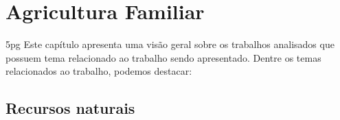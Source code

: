 \chapter{Agricultura Familiar} 5pg
Este cap\'{i}tulo apresenta uma vis\~{a}o geral sobre os trabalhos analisados que possuem tema relacionado ao trabalho sendo apresentado. Dentre os temas relacionados ao trabalho, podemos destacar:

\section{Recursos naturais}
